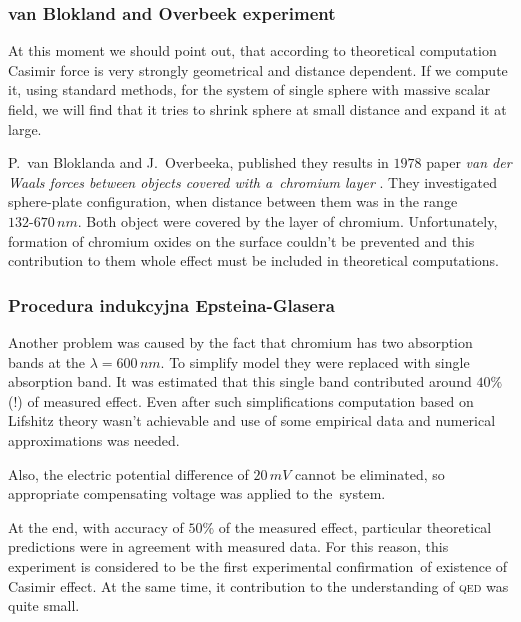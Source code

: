 \documentclass[10pt,t]{beamer}
\begin{document}
\begin{frame}
  \frametitle{van Blokland and Overbeek experiment}


  At this moment we should point out, that according to theoretical
  computation Casimir force is very strongly geometrical and distance
  dependent. If we compute it, using standard methods, for the system of
  single sphere with massive scalar field, we will find that it tries to
  shrink sphere at small distance and expand it at large.

  P.~van Bloklanda and J.~Overbeeka, published they results in $1978$ paper
  \textit{van der Waals forces between objects covered with a~chromium
    layer}
  \parencite{Blokland-Overbeek-van-der-Waals-Forces-between-ETC-Pub-1978}.
  They investigated sphere-plate configuration, when distance between them
  was in the range $132\text{-}670 \, \si{nm}$. Both object were covered by
  the layer of chromium. Unfortunately, formation of chromium oxides on the
  surface couldn't be prevented and this contribution to them whole effect
  must be included in theoretical computations.

\end{frame}





\begin{frame}
  \frametitle{Procedura indukcyjna Epsteina-Glasera}


  Another problem was caused by the fact that chromium has two absorption
  bands at the $\lambda = 600 \, \si{nm}$. To simplify model they were replaced
  with single absorption band. It was estimated that this single band
  contributed around $40\%$ (!) of measured effect. Even after such
  simplifications computation based on Lifshitz theory wasn't achievable and
  use of some empirical data and numerical approximations was needed.

  Also, the electric potential difference of $20 \, \si{mV}$ cannot be
  eliminated, so appropriate compensating voltage was  applied
  to the~system.

  At the end, with accuracy of $50\%$ of the measured effect, particular
  theoretical predictions were in agreement with measured data. For this
  reason, this experiment is considered to be the first experimental
  confirmation~of existence of Casimir effect. At the same time, it
  contribution to the understanding of \textsc{qed} was quite small.

\end{frame}
\end{document}
